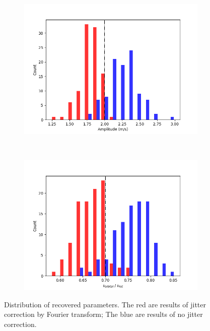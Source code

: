 \begin{figure}[tbp]	
    \begin{subfigure}[b]{0.49\textwidth}
        \includegraphics[width=\textwidth]{./Figures/Methods/Histogram_1.png}
        \caption{}
    \end{subfigure}
	~
    \begin{subfigure}[b]{0.49\textwidth}
        \includegraphics[width=\textwidth]{./Figures/Methods/Histogram_2.png}
        \caption{}
    \end{subfigure}	
    
    \caption[Distribution of recovered parameters]
    {Distribution of recovered parameters. The red are results of jitter correction by Fourier transform; 
    The blue are results of no jitter correction.}
\label{fig:FT_Statistics}
\end{figure}    


